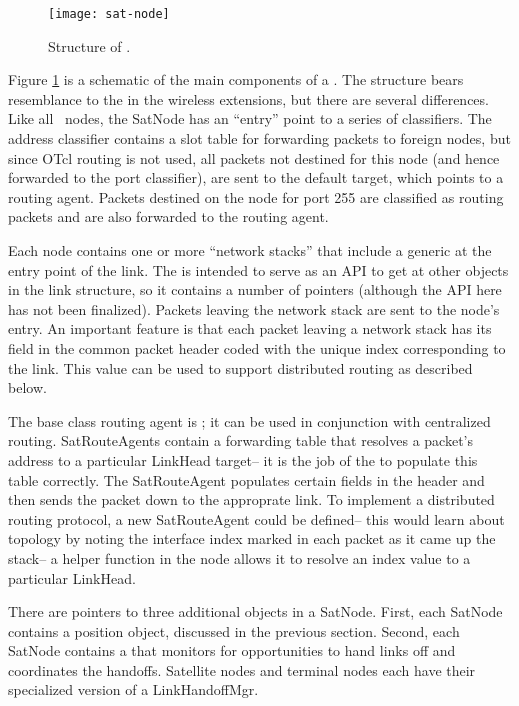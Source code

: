 \begin{figure}
    \centerline{\texttt{[image: sat-node]}}
    \caption{Structure of .}
    \label{fig:sat-node}
\end{figure}

Figure \ref{fig:sat-node} is a schematic of the main components of a
.  The structure bears resemblance to the 
in the wireless extensions, but there are several differences.  Like all
\ns~nodes, the SatNode has an ``entry'' point to a series of classifiers.
The address classifier contains a slot table for forwarding packets to 
foreign nodes, but since OTcl routing is not used, all packets not destined
for this node (and hence forwarded to the port classifier), are sent to
the default target, which points to a routing agent.  Packets destined
on the node for port 255 are classified as routing packets and are also
forwarded to the routing agent.

Each node contains one or more ``network stacks'' that include a generic
 at the entry point of the link.  The 
is intended to serve as an API to get at other objects in the link structure,
so it contains a number of pointers (although the API here has not been
finalized).  Packets leaving the network stack are sent to the node's
entry.  An important feature is that each packet leaving a network stack
has its  field in the common packet header coded with the
unique  index corresponding to the link.  This value
can be used to support distributed routing as described below.

The base class routing agent is ; it can be used 
in conjunction with centralized routing.  SatRouteAgents contain
a forwarding table that resolves a packet's address to a particular 
LinkHead target-- it is the job of the  to populate this
table correctly.  The SatRouteAgent populates certain fields in the header
and then sends the packet down to the approprate link.  To implement
a distributed routing protocol, a new SatRouteAgent could be defined-- this
would learn about topology by noting the interface index marked in each 
packet as it came up the stack-- a helper function in the node 
 allows it to resolve an index value to
a particular LinkHead. 

There are pointers to three additional objects in a SatNode.  First,
each SatNode contains a position object, discussed in the previous section.
Second, each SatNode contains a  that monitors
for opportunities to hand links off and coordinates the handoffs.  Satellite
nodes and terminal nodes each have their specialized version of a 
LinkHandoffMgr.

